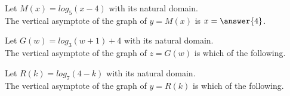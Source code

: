 \documentclass{ximera}
\author{Lee Wayand}
\begin{document}
\begin{exercise}







\begin{question}

Let $M(x) = log_5(x-4)$ with its natural domain. \\

The vertical asymptote of the graph of $y = M(x)$ is $x = \answer{4}$.


\end{question}








\begin{question}

Let $G(w) = log_3(w+1) + 4$ with its natural domain. \\

The vertical asymptote of the graph of $z = G(w)$ is which of the following.



\begin{multipleChoice}
\end{multipleChoice}


\end{question}









\begin{question}

Let $R(k) = log_7(4-k)$ with its natural domain. \\

The vertical asymptote of the graph of $y = R(k)$ is which of the following.



\begin{multipleChoice}
\end{multipleChoice}


\end{question}












\end{exercise}
\end{document}

